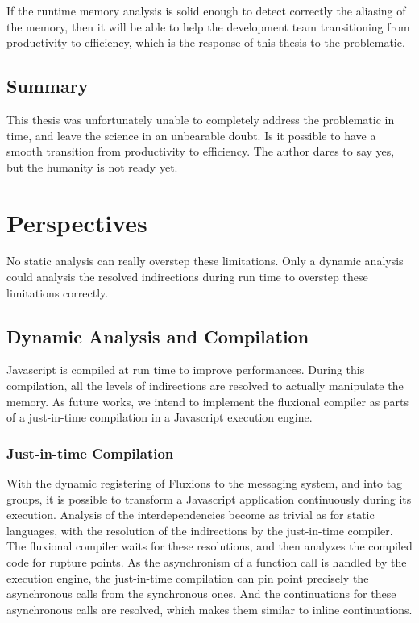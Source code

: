 If the runtime memory analysis is solid enough to detect correctly the aliasing of the memory, then it will be able to help the development team transitioning from productivity to efficiency, which is the response of this thesis to the problematic.


\subsection{Summary}

This thesis was unfortunately unable to completely address the problematic in time, and leave the science in an unbearable doubt.
Is it possible to have a smooth transition from productivity to efficiency.
The author dares to say yes, but the humanity is not ready yet.


\section{Perspectives}

No static analysis can really overstep these limitations.
Only a dynamic analysis could analysis the resolved indirections during run time to overstep these limitations correctly.

\subsection{Dynamic Analysis and Compilation}

Javascript is compiled at run time to improve performances.
During this compilation, all the levels of indirections are resolved to actually manipulate the memory.
As future works, we intend to implement the fluxional compiler as parts of a just-in-time compilation in a Javascript execution engine.

\subsubsection{Just-in-time Compilation}

With the dynamic registering of Fluxions to the messaging system, and into tag groups, it is possible to transform a Javascript application continuously during its execution.
Analysis of the interdependencies become as trivial as for static languages, with the resolution of the indirections by the just-in-time compiler.
The fluxional compiler waits for these resolutions, and then analyzes the compiled code for rupture points.
As the asynchronism of a function call is handled by the execution engine, the just-in-time compilation can pin point precisely the asynchronous calls from the synchronous ones. 
And the continuations for these asynchronous calls are resolved, which makes them similar to inline continuations.

